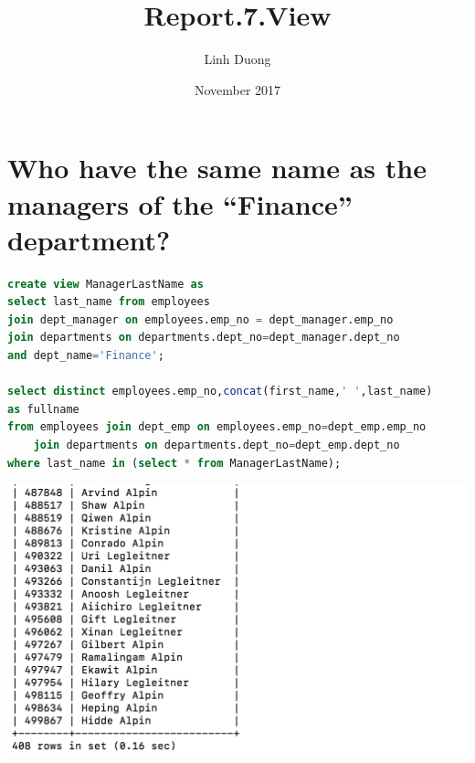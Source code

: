 \documentclass{article}
\title{Report.7.View}
\author{Linh Duong}
\date{November 2017}
\begin{document}
\maketitle

\section{Who have the same name as the managers of the “Finance” department?}
\begin{lstlisting}[language=sql]
create view ManagerLastName as 
select last_name from employees 
join dept_manager on employees.emp_no = dept_manager.emp_no
join departments on departments.dept_no=dept_manager.dept_no 
and dept_name='Finance';

select distinct employees.emp_no,concat(first_name,' ',last_name) 
as fullname
from employees join dept_emp on employees.emp_no=dept_emp.emp_no 
	join departments on departments.dept_no=dept_emp.dept_no
where last_name in (select * from ManagerLastName);
\end{lstlisting}
\includegraphics[width=\linewidth]{1.png}
\end{document}
